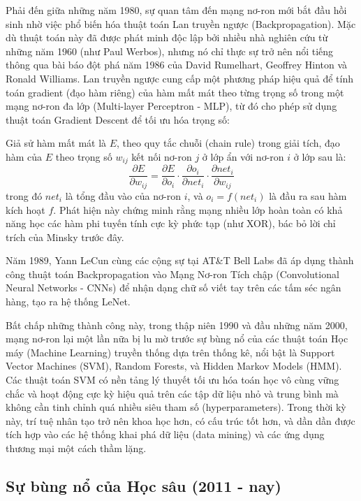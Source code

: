 Phải đến giữa những năm 1980, sự quan tâm đến mạng nơ-ron mới bắt đầu hồi sinh nhờ việc phổ biến hóa thuật toán Lan truyền ngược (Backpropagation). Mặc dù thuật toán này đã được phát minh độc lập bởi nhiều nhà nghiên cứu từ những năm 1960 (như Paul Werbos), nhưng nó chỉ thực sự trở nên nổi tiếng thông qua bài báo đột phá năm 1986 của David Rumelhart, Geoffrey Hinton và Ronald Williams. Lan truyền ngược cung cấp một phương pháp hiệu quả để tính toán gradient (đạo hàm riêng) của hàm mất mát theo từng trọng số trong một mạng nơ-ron đa lớp (Multi-layer Perceptron - MLP), từ đó cho phép sử dụng thuật toán Gradient Descent để tối ưu hóa trọng số:

Giả sử hàm mất mát là $E$, theo quy tắc chuỗi (chain rule) trong giải tích, đạo hàm của $E$ theo trọng số $w_{ij}$ kết nối nơ-ron $j$ ở lớp ẩn với nơ-ron $i$ ở lớp sau là:
\begin{equation}
\frac{\partial E}{\partial w_{ij}} = \frac{\partial E}{\partial o_i} \cdot \frac{\partial o_i}{\partial net_i} \cdot \frac{\partial net_i}{\partial w_{ij}}
\end{equation}
trong đó $net_i$ là tổng đầu vào của nơ-ron $i$, và $o_i = f(net_i)$ là đầu ra sau hàm kích hoạt $f$. Phát hiện này chứng minh rằng mạng nhiều lớp hoàn toàn có khả năng học các hàm phi tuyến tính cực kỳ phức tạp (như XOR), bác bỏ lời chỉ trích của Minsky trước đây.

Năm 1989, Yann LeCun cùng các cộng sự tại AT\&T Bell Labs đã áp dụng thành công thuật toán Backpropagation vào Mạng Nơ-ron Tích chập (Convolutional Neural Networks - CNNs) để nhận dạng chữ số viết tay trên các tấm séc ngân hàng, tạo ra hệ thống LeNet.

Bất chấp những thành công này, trong thập niên 1990 và đầu những năm 2000, mạng nơ-ron lại một lần nữa bị lu mờ trước sự bùng nổ của các thuật toán Học máy (Machine Learning) truyền thống dựa trên thống kê, nổi bật là Support Vector Machines (SVM), Random Forests, và Hidden Markov Models (HMM). Các thuật toán SVM có nền tảng lý thuyết tối ưu hóa toán học vô cùng vững chắc và hoạt động cực kỳ hiệu quả trên các tập dữ liệu nhỏ và trung bình mà không cần tinh chỉnh quá nhiều siêu tham số (hyperparameters). Trong thời kỳ này, trí tuệ nhân tạo trở nên khoa học hơn, có cấu trúc tốt hơn, và dần dần được tích hợp vào các hệ thống khai phá dữ liệu (data mining) và các ứng dụng thương mại một cách thầm lặng.

\newpage

\subsection{Sự bùng nổ của Học sâu (2011 - nay)}

